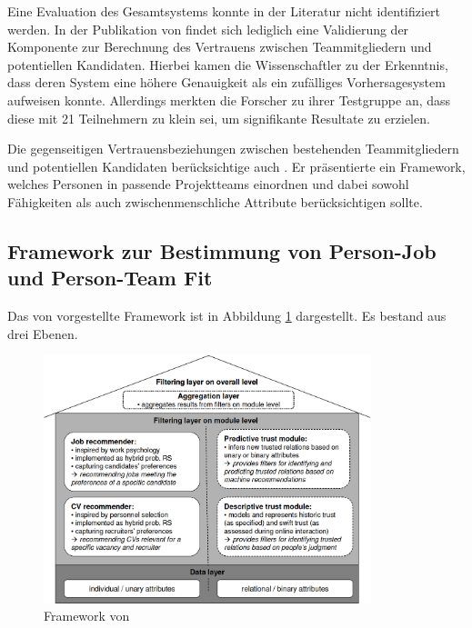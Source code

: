 Eine Evaluation des Gesamtsystems konnte in der Literatur nicht identifiziert werden. In der Publikation von \textcite[S. 13ff.]{malinowski:2008} findet sich lediglich eine Validierung der Komponente zur Berechnung des Vertrauens zwischen Teammitgliedern und potentiellen Kandidaten. Hierbei kamen die Wissenschaftler zu der Erkenntnis, dass deren System eine höhere Genauigkeit als ein zufälliges Vorhersagesystem aufweisen konnte. Allerdings merkten die Forscher zu ihrer Testgruppe an, dass diese mit 21 Teilnehmern zu klein sei, um signifikante Resultate zu erzielen.

Die gegenseitigen Vertrauensbeziehungen zwischen bestehenden Teammitgliedern und potentiellen Kandidaten berücksichtige auch \textcite[S. 1ff.]{keim:2007}. Er präsentierte ein Framework, welches Personen in passende Projektteams einordnen und dabei sowohl Fähigkeiten als auch zwischenmenschliche Attribute berücksichtigen sollte.

\subsection{Framework zur Bestimmung von Person-Job und Person-Team Fit}
\label{ch:verwandteArbeiten:aufDemPEFitBasierendeBilateraleSysteme:pjUndPtFit}
Das von \textcite[S. 1ff.]{keim:2007} vorgestellte Framework ist in Abbildung \ref{fig:verwandteArbeiten:abb3} dargestellt. Es bestand aus drei Ebenen.

\begin{figure}[h]
	\centering
	\includegraphics[width=0.85\textwidth]{gfx/keim-multilayer.png}
	\caption{Framework von \textcite[S. 5]{keim:2007}}
	\label{fig:verwandteArbeiten:abb3}
\end{figure}

